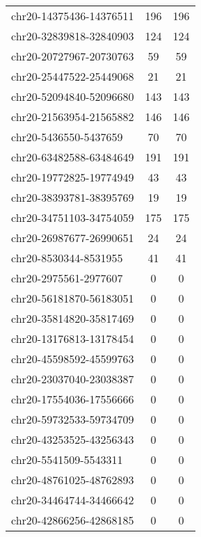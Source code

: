 \documentclass[10pt,letterpaper]{article}
\begin{document}
{\begin{longtable}{lSS}
	chr20-14375436-14376511 & 196    & 196                   \\
	chr20-32839818-32840903 & 124    & 124                   \\
	chr20-20727967-20730763 & 59     & 59                    \\
	chr20-25447522-25449068 & 21     & 21                    \\
	chr20-52094840-52096680 & 143    & 143                   \\
	chr20-21563954-21565882 & 146    & 146                   \\
	chr20-5436550-5437659   & 70     & 70                    \\
	chr20-63482588-63484649 & 191    & 191                   \\
	chr20-19772825-19774949 & 43     & 43                    \\
	chr20-38393781-38395769 & 19     & 19                    \\
	chr20-34751103-34754059 & 175    & 175                   \\
	chr20-26987677-26990651 & 24     & 24                    \\
	chr20-8530344-8531955   & 41     & 41                    \\
	chr20-2975561-2977607   & 0      & 0                     \\
	chr20-56181870-56183051 & 0      & 0                     \\
	chr20-35814820-35817469 & 0      & 0                     \\
	chr20-13176813-13178454 & 0      & 0                     \\
	chr20-45598592-45599763 & 0      & 0                     \\
	chr20-23037040-23038387 & 0      & 0                     \\
	chr20-17554036-17556666 & 0      & 0                     \\
	chr20-59732533-59734709 & 0      & 0                     \\
	chr20-43253525-43256343 & 0      & 0                     \\
	chr20-5541509-5543311   & 0      & 0                     \\
	chr20-48761025-48762893 & 0      & 0                     \\
	chr20-34464744-34466642 & 0      & 0                     \\
	chr20-42866256-42868185 & 0      & 0                     \\

\end{longtable}}
\end{document}
